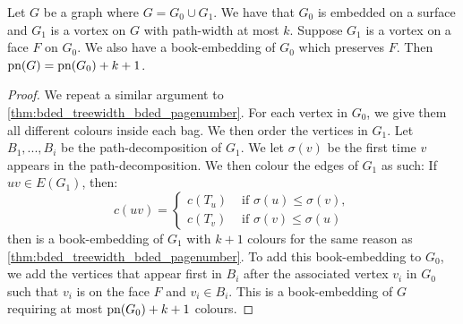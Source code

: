 \begin{lemma}\label{lem:preserved_faces_pagenumber}
	Let $G$ be a graph where $G = G_0 \cup G_1$. We have that $G_0$ is embedded on a surface and $G_1$ is a vortex on $G$ with path-width at most $k$. Suppose $G_1$ is a vortex on a face $F$ on $G_0$. We also have a book-embedding of $G_0$ which preserves $F$. Then $\text{pn}(G) = \text{pn}(G_0) + k + 1$. 
\end{lemma}

\begin{proof}
	We repeat a similar argument to \cref{thm:bded_treewidth_bded_pagenumber}. For each vertex in $G_0$, we give them all different colours inside each bag. We then order the vertices in $G_1$. Let $B_1, ..., B_i$ be the path-decomposition of $G_1$. We let $\sigma(v)$ be the first time $v$ appears in the path-decomposition. We then colour the edges of $G_1$ as such: If $uv \in E(G_1)$, then:
	\begin{equation}
		c(uv) = 
		\begin{cases}
			c(T_u) &\text{ if } \sigma(u) \leq \sigma(v),\\
			c(T_v) &\text{ if } \sigma(v) \leq \sigma(u)
		\end{cases}
	\end{equation}
	then is a book-embedding of $G_1$ with $k+1$ colours for the same reason as \cref{thm:bded_treewidth_bded_pagenumber}.
	To add this book-embedding to $G_0$, we add the vertices that appear first in $B_i$ after the associated vertex $v_i$ in $G_0$ such that $v_i$ is on the face $F$ and $v_i \in B_i$. This is a book-embedding of $G$ requiring at most $\text{pn}(G_0) + k + 1$ colours. 
\end{proof}

